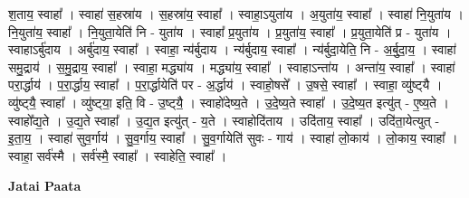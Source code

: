 \documentclass[17pt]{extarticle}
\begin{document}
श॒ताय॒ स्वाहा᳚ । स्वाहा॑ स॒हस्रा॑य । स॒हस्रा॑य॒ स्वाहा᳚ । स्वाहा॒ऽयुता॑य । अ॒युता॑य॒ स्वाहा᳚ । स्वाहा॑ नि॒युता॑य । नि॒युता॑य॒ स्वाहा᳚ । नि॒युता॒येति॑ नि - युता॑य । स्वाहा᳚ प्र॒युता॑य । प्र॒युता॑य॒ स्वाहा᳚ । प्र॒युता॒येति॑ प्र - युता॑य । स्वाहाऽर्बु॑दाय । अर्बु॑दाय॒ स्वाहा᳚ । स्वाहा॒ न्य॑र्बुदाय । न्य॑र्बुदाय॒ स्वाहा᳚ । न्य॑र्बुदा॒येति॒ नि - अ॒र्बु॒दा॒य॒ । स्वाहा॑ समु॒द्राय॑ । स॒मु॒द्राय॒ स्वाहा᳚ । स्वाहा॒ मद्ध्या॑य । मद्ध्या॑य॒ स्वाहा᳚ । स्वाहाऽन्ता॑य । अन्ता॑य॒ स्वाहा᳚ । स्वाहा॑ परा॒र्द्धाय॑ । प॒रा॒र्द्धाय॒ स्वाहा᳚ । प॒रा॒र्द्धायेति॑ पर - अ॒र्द्धाय॑ । स्वाहो॒षसे᳚ । उ॒षसे॒ स्वाहा᳚ । स्वाहा॒ व्यु॑ष्ट्‍यै । व्यु॑ष्ट्‍यै॒ स्वाहा᳚ । व्यु॑ष्ट्‍या॒ इति॒ वि - उ॒ष्ट्‍यै॒ । स्वाहो॑देष्य॒ते । उ॒दे॒ष्य॒ते स्वाहा᳚ । उ॒दे॒ष्य॒त इत्यु॑त् - ए॒ष्य॒ते । स्वाहो᳚द्य॒ते । उ॒द्य॒ते स्वाहा᳚ । उ॒द्य॒त इत्यु॑त् - य॒ते । स्वाहोदि॑ताय । उदि॑ताय॒ स्वाहा᳚ । उदि॑ता॒येत्युत् - इ॒ता॒य॒ । स्वाहा॑ सुव॒र्गाय॑ । सु॒व॒र्गाय॒ स्वाहा᳚ । सु॒व॒र्गायेति॑ सुवः - गाय॑ । स्वाहा॑ लो॒काय॑ । लो॒काय॒ स्वाहा᳚ । स्वाहा॒ सर्व॑स्मै । सर्व॑स्मै॒ स्वाहा᳚ । स्वाहेति॒ स्वाहा᳚ । \newline

\textbf{Jatai Paata} \newline
\end{document}
